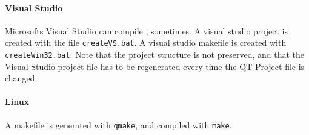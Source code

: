 \paragraph{Visual Studio}
Microsofts Visual Studio can compile \ER, sometimes.
A visual studio project is created with the file \texttt{createVS.bat}.
A visual studio makefile is created with \texttt{createWin32.bat}.
Note that the project structure is not preserved, and that the Visual Studio project file has to be regenerated every time the QT Project file is changed.

\paragraph{Linux}
A makefile is generated with \texttt{qmake}, and compiled with \texttt{make}.
